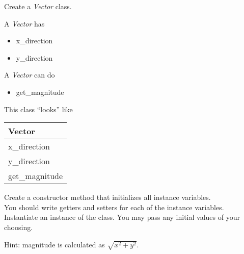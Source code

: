 
	\item Create a \textit{Vector} class.\\
	\begin{minipage}{.6\textwidth}
		A \textit{Vector} has
		\begin{itemize}
			\item x\_direction 
			\item y\_direction
		\end{itemize}
		
		A \textit{Vector} can do
		\begin{itemize}
			\item get\_magnitude
		\end{itemize}
	\end{minipage}
	\begin{minipage}{.4\textwidth}
		This class ``looks'' like 
				
		\vspace*{1em}
		\begin{tabular}{|l|}
			\hline Vector\\ \hline
			x\_direction\\ y\_direction\\ \hline
			get\_magnitude\\  \hline
		\end{tabular}
	\end{minipage}

	\vspace*{2ex}
	Create a constructor method that initializes all instance variables.\\
	You should write getters and setters for each of the instance variables.\\
	Instantiate an instance of the class. You may pass any initial values of your choosing.
	
	Hint: magnitude is calculated as $\sqrt{x^2 + y^2}$.



